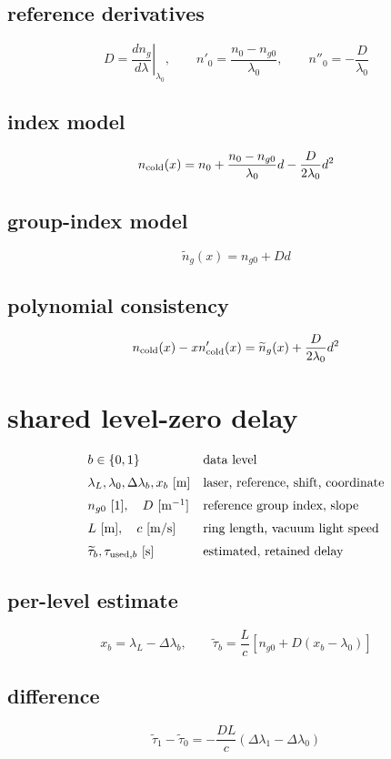 \documentclass[11pt]{article}
\begin{document}
\subsection*{reference derivatives}
\[
\displaystyle D=\left.\frac{dn_g}{d\lambda}\right|_{\lambda_0},\qquad n'_0=\frac{n_0-n_{g0}}{\lambda_0},\qquad n''_0=-\frac{D}{\lambda_0}
\]
\subsection*{index model}
\[
\displaystyle n_{\rm cold}(x)=n_0+\frac{n_0-n_{g0}}{\lambda_0}d-\frac{D}{2\lambda_0}d^2
\]
\subsection*{group-index model}
\[
\displaystyle \widetilde n_g(x)=n_{g0}+Dd
\]
\subsection*{polynomial consistency}
\[
\displaystyle n_{\rm cold}(x)-x n'_{\rm cold}(x)=\widetilde n_g(x)+\frac{D}{2\lambda_0}d^2
\]

\clearpage
\section*{shared level-zero delay}
\[
\begin{array}{ll}b\in\{0,1\}&\text{data level}\\[0.6em]\lambda_L,\lambda_0,\Delta\lambda_b,x_b\ [\mathrm m]&\text{laser, reference, shift, coordinate}\\[0.6em]n_{g0}\ [1],\quad D\ [\mathrm{m^{-1}}]&\text{reference group index, slope}\\[0.6em]L\ [\mathrm m],\quad c\ [\mathrm{m/s}]&\text{ring length, vacuum light speed}\\[0.6em]\widetilde\tau_b,\tau_{{\rm used},b}\ [\mathrm s]&\text{estimated, retained delay}\end{array}
\]
\subsection*{per-level estimate}
\[
\displaystyle x_b=\lambda_L-\Delta\lambda_b,\qquad\widetilde\tau_b=\frac{L}{c}[n_{g0}+D(x_b-\lambda_0)]
\]
\subsection*{difference}
\[
\displaystyle \widetilde\tau_1-\widetilde\tau_0=-\frac{DL}{c}(\Delta\lambda_1-\Delta\lambda_0)
\]
\end{document}
